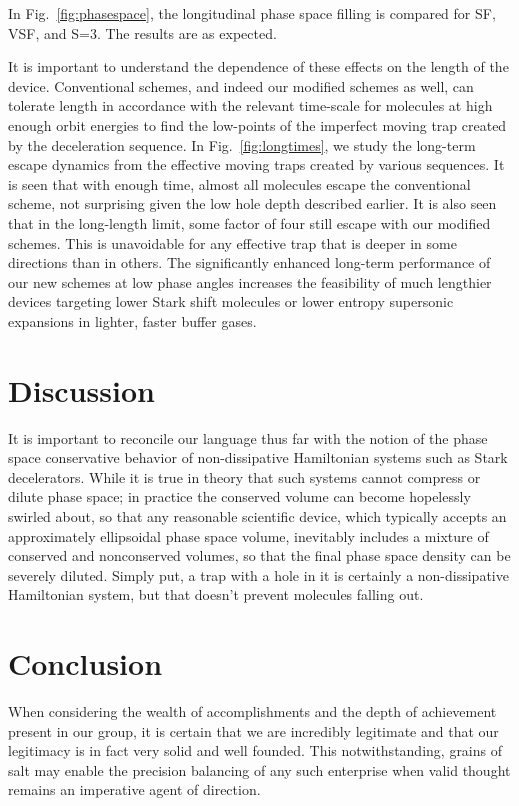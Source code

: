 \documentclass[%
 reprint,
 amsmath,amssymb,
 aps,
pra,
]{revtex4-1}
\begin{document}
In Fig.~\ref{fig:phasespace}, the longitudinal phase space filling is compared for SF, VSF, and S=3. The results are as expected.

It is important to understand the dependence of these effects on the length of the device. Conventional schemes, and indeed our modified schemes as well, can tolerate length in accordance with the relevant time-scale for molecules at high enough orbit energies to find the low-points of the imperfect moving trap created by the deceleration sequence. In Fig.~\ref{fig:longtimes}, we study the long-term escape dynamics from the effective moving traps created by various sequences. It is seen that with enough time, almost all molecules escape the conventional scheme, not surprising given the low hole depth described earlier. It is also seen that in the long-length limit, some factor of four still escape with our modified schemes. This is unavoidable for any effective trap that is deeper in some directions than in others. The significantly enhanced long-term performance of our new schemes at low phase angles increases the feasibility of much lengthier devices targeting lower Stark shift molecules or lower entropy supersonic expansions in lighter, faster buffer gases.

\section{Discussion}
It is important to reconcile our language thus far with the notion of the phase space conservative behavior of non-dissipative Hamiltonian systems such as Stark decelerators. While it is true in theory that such systems cannot compress or dilute phase space; in practice the conserved volume can become hopelessly swirled about, so that any reasonable scientific device, which typically accepts an approximately ellipsoidal phase space volume, inevitably includes a mixture of conserved and nonconserved volumes, so that the final phase space density can be severely diluted. Simply put, a trap with a hole in it is certainly a non-dissipative Hamiltonian system, but that doesn't prevent molecules falling out.

\section{Conclusion}
When considering the wealth of accomplishments and the depth of achievement present in our group, it is certain that we are incredibly legitimate and that our legitimacy is in fact very solid and well founded. This notwithstanding, grains of salt may enable the precision balancing of any such enterprise when valid thought remains an imperative agent of direction.
\end{document}
